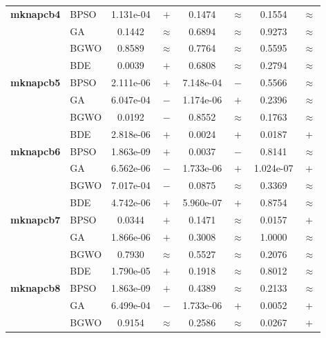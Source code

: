 \begin{table}[htbp]
\begin{tabular*}{\textwidth}{@{\extracolsep{\fill}}llcccccc@{}}
    \midrule
    \textbf{mknapcb4}  & BPSO  & 1.131e-04 & $+$ &    0.1474 & $\approx$ &    0.1554 & $\approx$ \\
                       & GA    &    0.1442 & $\approx$ &    0.6894 & $\approx$ &    0.9273 & $\approx$ \\
                       & BGWO  &    0.8589 & $\approx$ &    0.7764 & $\approx$ &    0.5595 & $\approx$ \\
                       & BDE   &    0.0039 & $+$ &    0.6808 & $\approx$ &    0.2794 & $\approx$ \\
    \midrule
    \textbf{mknapcb5}  & BPSO  & 2.111e-06 & $+$ & 7.148e-04 & $-$ &    0.5566 & $\approx$ \\
                       & GA    & 6.047e-04 & $-$ & 1.174e-06 & $+$ &    0.2396 & $\approx$ \\
                       & BGWO  &    0.0192 & $-$ &    0.8552 & $\approx$ &    0.1763 & $\approx$ \\
                       & BDE   & 2.818e-06 & $+$ &    0.0024 & $+$ &    0.0187 & $+$ \\
    \midrule
    \textbf{mknapcb6}  & BPSO  & 1.863e-09 & $+$ &    0.0037 & $-$ &    0.8141 & $\approx$ \\
                       & GA    & 6.562e-06 & $-$ & 1.733e-06 & $+$ & 1.024e-07 & $+$ \\
                       & BGWO  & 7.017e-04 & $-$ &    0.0875 & $\approx$ &    0.3369 & $\approx$ \\
                       & BDE   & 4.742e-06 & $+$ & 5.960e-07 & $+$ &    0.8754 & $\approx$ \\
    \midrule
    \textbf{mknapcb7}  & BPSO  &    0.0344 & $+$ &    0.1471 & $\approx$ &    0.0157 & $+$ \\
                       & GA    & 1.866e-06 & $+$ &    0.3008 & $\approx$ &    1.0000 & $\approx$ \\
                       & BGWO  &    0.7930 & $\approx$ &    0.5527 & $\approx$ &    0.2076 & $\approx$ \\
                       & BDE   & 1.790e-05 & $+$ &    0.1918 & $\approx$ &    0.8012 & $\approx$ \\
    \midrule
    \textbf{mknapcb8}  & BPSO  & 1.863e-09 & $+$ &    0.4389 & $\approx$ &    0.2133 & $\approx$ \\
                       & GA    & 6.499e-04 & $-$ & 1.733e-06 & $+$ &    0.0052 & $+$ \\
                       & BGWO  &    0.9154 & $\approx$ &    0.2586 & $\approx$ &    0.0267 & $+$ \\

\end{tabular*}
\end{table}
